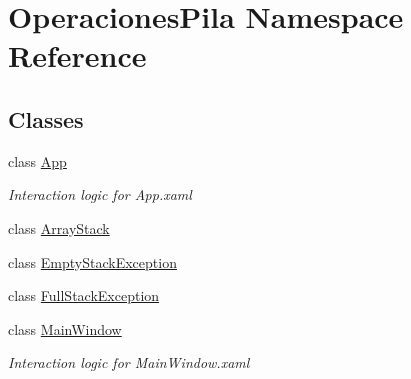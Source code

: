 \hypertarget{namespace_operaciones_pila}{}\section{Operaciones\+Pila Namespace Reference}
\label{namespace_operaciones_pila}
\subsection*{Classes}
\begin{DoxyCompactItemize}
\item 
class \hyperlink{class_operaciones_pila_1_1_app}{App}
\begin{DoxyCompactList}\small\item\em Interaction logic for App.\+xaml \end{DoxyCompactList}\item 
class \hyperlink{class_operaciones_pila_1_1_array_stack}{Array\+Stack}
\item 
class \hyperlink{class_operaciones_pila_1_1_empty_stack_exception}{Empty\+Stack\+Exception}
\item 
class \hyperlink{class_operaciones_pila_1_1_full_stack_exception}{Full\+Stack\+Exception}
\item 
class \hyperlink{class_operaciones_pila_1_1_main_window}{Main\+Window}
\begin{DoxyCompactList}\small\item\em Interaction logic for Main\+Window.\+xaml \end{DoxyCompactList}\end{DoxyCompactItemize}
